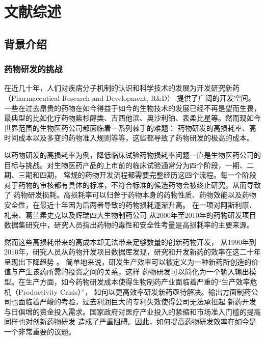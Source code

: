 \cleardoublepage
\newrefsection
\chapter{文献综述}

\section{背景介绍}

\subsection{药物研发的挑战}
在近几十年，人们对疾病分子机制的认识和科学技术的发展为开发研究新药
（Pharmaceutical Research and Development, R\&D）
提供了广阔的开发空间\cite{pammolliProductivityCrisisPharmaceutical2011}。一些在过去昂贵的药物在如今得益于如今的生物技术的发展已经不再是望而生畏，
最典型的比如化疗药物紫杉醇类、吉西他滨、奥沙利铂、表柔比星等。然而现如今世界范围的生物医药公司都面临着一系列棘手的难题：
药物研发的高损耗率、高时间成本以及多变的药物准入规则等等，这些都导致了药物研发的极高的成本\cite{pushpakomDrugRepurposingProgress2019}。

\par 以药物研发的高损耗率为例，降低临床试验药物损耗率问题一直是生物医药公司的目标与挑战。对生物医药产品的上市前的临床试验通常分为四个阶段，一期、二期、三期和四期，
常规的药物开发流程都需要完整经历这四个流程。每一个阶段对于药物的审核都有具体的标准，不符合标准的候选药物会被终止研究，从而导致了
药物研发损耗。高损耗率可以归咎于药物本身的药物性质、药物效能以及药物安全性，在最近十年因为后两者导致的药物损耗逐渐升高\cite{bunnageGettingPharmaceuticalBack2011, kolaCanPharmaceuticalIndustry2004, hayClinicalDevelopmentSuccess2014}。
在一项对阿斯利康、礼来、葛兰素史克以及辉瑞四大生物制药公司
从2000年至2010年的药物研发项目数据集研究中，研究人员指出药物的毒性和安全性考量是高损耗率的主要来源\cite{waringAnalysisAttritionDrug2015}。


\par 然而这些高损耗带来的高成本却无法带来足够数量的创新药物开发，
从1990年到2010年，研究人员从药物开发项目数据库发现，研究和开发新药的效率在这二十年呈现出下降趋势
\cite{pammolliProductivityCrisisPharmaceutical2011}。
简单地来说，研发生产效率可以被定义为一种新药所创造的价值与产生该药所需的投资之间的关系\cite{paulHowImproveProductivity2010}，这样
药物研发可以简化为一个输入输出模型。在生产方面，如今药物研发成本使得生物制药产业面临着严重的“生产效率危机（Productivity Crisis）”，
如何以更高效率研发新药亟待解决。输出方面制药公司也面临着严峻的考验，过去利润巨大的专利失效\cite{EvaluatePharmaAlphaWorld2014}使得公司无法承担起
新药开发与日俱增的资金投入需求。国家政府对医疗产业投入的紧缩和市场准入门槛的提高\cite{paulHowImproveProductivity2010}同样也对创新药物研发
造成了严重阻碍。因此，如何提高药物研发效率在如今是一个非常重要的议题。


